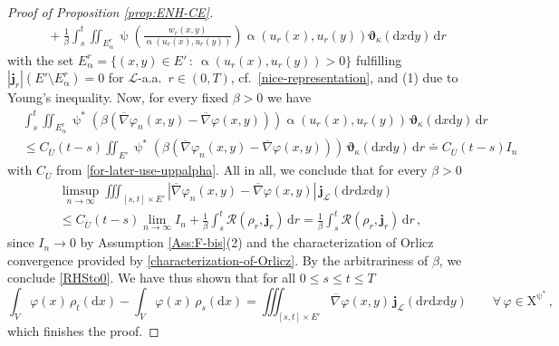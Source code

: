 \documentclass[11pt,reqno]{amsart}
\numberwithin{equation}{section}
\newcommand{\scrL}{\mathscr{L}}
\newcommand{\dnabla}{\overline\nabla}
\newcommand{\dd}{\mathrm{d}}
\theoremstyle{definition}
\def\dd{\mathrm{d}}
\newcommand{\teta}{\boldsymbol \vartheta}
\newcommand{\tetapi}{\boldsymbol{\teta}_{\kappa}}
\newcommand{\Lebone}{\scrL}
\newcommand{\bj}{{\boldsymbol j}}
\newcommand{\scrR}{\mathscr{R}}
\newcommand{\jj}{{\boldsymbol{j}}}
\newcommand{\Ed}{{E'}}
\newcommand{\rmX}{\mathrm{X}}
\numberwithin{equation}{section}
\begin{document}
\begin{proof}[Proof of Proposition \ref{prop:ENH-CE}]
\[\begin{aligned}
        & \quad 
         +  \frac1{\beta}\int_s^t  \iint_{E_\upalpha^r} \uppsi\left( \frac{w_r(x,y)}{\upalpha(u_r(x), u_r(y))} \right) \upalpha(u_r(x), u_r(y)) \tetapi(\dd x \dd y ) \, \dd r
         \end{aligned}
                     \]
          with the set $E_\upalpha^r = \{ (x,y)\in \Ed\, : \ \upalpha(u_r(x), u_r(y))>0 \} $ fulfilling $|\bj_r|(\Ed{\setminus}E_\upalpha^r )=0$ for 
       $\Lebone$-a.a.\ $r\in (0,T)$, cf.\ \eqref{nice-representation}, and {\footnotesize (1)} due to Young's inequality.
       Now, for every fixed $\beta>0$ we have
       \[
       \begin{aligned}
       &
       \int_s^t  \iint_{E_\upalpha^r} \uppsi^*(\beta (\dnabla\varphi_n(x,y){-} \dnabla\varphi(x,y) )) \upalpha(u_r(x), u_r(y)) \, \tetapi(\dd x \dd y ) \, \dd r
       \\
       & 
       \leq C_{\overline U}   (t{-}s)  \iint_{\Ed} \uppsi^*(\beta (\dnabla\varphi_n(x,y){-} \dnabla\varphi(x,y) )) \, \tetapi(\dd x \dd y ) \, \dd r \doteq  C_{\overline U} (t{-}s) I_n
       \end{aligned}
       \]
       with $ C_{\overline U}$ from \eqref{for-later-use-uppalpha}.
       All in all, we conclude that for every $\beta>0$
       \[
       \begin{aligned}
       &
   \limsup_{n\to \infty}     \iiint_{[s,t]{\times}\Ed}   \left|\dnabla\varphi_n(x,y){-} \dnabla\varphi(x,y) \right|  \, \jj_\Lebone(\dd r \dd x \dd y) 
\\ &    \leq  C_{\overline U}  (t{-}s) \lim_{n\to\infty} I_n + \frac1{\beta}\int_s^t   \scrR(\rho_r,\bj_r)\, \dd r
   =   \frac1{\beta}\int_s^t   \scrR(\rho_r,\bj_r)\, \dd r\,,
   \end{aligned}
       \]
       since $I_n \to 0$ by Assumption \ref{Ass:F-bis}(2) and the characterization of Orlicz convergence provided by \eqref{characterization-of-Orlicz}. 
         By the arbitrariness of $\beta$, we conclude \eqref{RHSto0}. We have thus shown that 
        for all $ 0\leq s \leq t\leq T$
         \[
        \int_V\varphi(x)\,\rho_t (\dd x) - \int_V\varphi(x)\, \rho_s  (\dd x) = \iiint_{[s,t]{\times}\Ed} \dnabla\varphi(x,y)\, \jj_\Lebone(\dd r \dd x \dd y) \qquad \forall\, \varphi \in  \rmX^{\uppsi^*}\,,
            \]
       which
        finishes the proof. 
\end{proof}       
       
         
           
\end{document}
